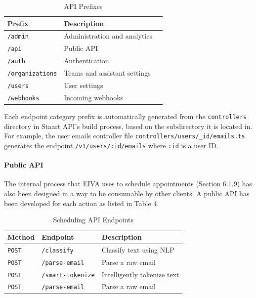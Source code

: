 \documentclass{article}
\begin{document}
\begin{table}[!htb]
	\begin{minipage}{1\linewidth}
		\caption{API Prefixes}
		\centering
		\begin{tabular}{lll}
			\hline
			\textbf{Prefix} & \textbf{Description} \\
			\hline
			\texttt{/admin} & Administration and analytics \\
			\texttt{/api} & Public API \\
			\texttt{/auth} & Authentication \\
			\texttt{/organizations} & Teams and assistant settings \\
			\texttt{/users} & User settings \\
			\texttt{/webhooks} & Incoming webhooks \\
			\hline
		\end{tabular}
	\end{minipage}%
\end{table}

Each endpoint category prefix is automatically generated from the \texttt{controllers} directory in Staart API's build process, based on the subdirectory it is located in. For example, the user emails controller file \texttt{controllers/users/\_id/emails.ts} generates the endpoint \texttt{/v1/users/:id/emails} where \texttt{:id} is a user ID.

\paragraph{Public API}

The internal process that EIVA uses to schedule appointments (Section 6.1.9) has also been designed in a way to be consumable by other clients. A public API has been developed for each action as listed in Table 4.

\begin{table}[!htb]
	\begin{minipage}{1\linewidth}
		\caption{Scheduling API Endpoints}
		\centering
		\begin{tabular}{lll}
			\hline
			\textbf{Method} & \textbf{Endpoint} & \textbf{Description} \\
			\hline
			\texttt{POST} & \texttt{/classify} & Classify text using NLP \\
			\texttt{POST} & \texttt{/parse-email} & Parse a raw email \\
			\texttt{POST} & \texttt{/smart-tokenize} & Intelligently tokenize text \\
			\texttt{POST} & \texttt{/parse-email} & Parse a raw email \\
			\hline
		\end{tabular}
	\end{minipage}%
\end{table}
\end{document}
